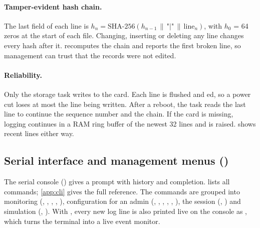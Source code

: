 \paragraph{Tamper-evident hash chain.} The last field of each line is
$h_n = \mathrm{SHA\text{-}256}(h_{n-1} \,\|\, \texttt{"|"} \,\|\, \text{line}_n)$, with $h_0$ = 64
zeros at the start of each file. Changing, inserting or deleting any line changes every hash after
it.  recomputes the chain and reports the first broken line, so management can
trust that the records were not edited.

\paragraph{Reliability.} Only the storage task writes to the card. Each line is flushed and
ed, so a power cut loses at most the line being written. After a reboot, the task reads
the last line to continue the sequence number and the chain. If the card is missing, logging
continues in a RAM ring buffer of the newest 32 lines and  is raised.
 shows recent lines either way.


\subsection{Serial interface and management menus ()}
\label{sec:op-cli}
The serial console () gives a  prompt with history and
 completion.  lists all commands; \cref{app:cli} gives the full reference.
The commands are grouped into monitoring (, , , ,
), configuration for an admin (, , ,
, , ), the session (, ) and
simulation (, ).
With , every new log line is also printed live on the console as
, which turns the terminal into a live event monitor.

